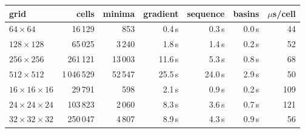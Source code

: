 \begin{tabular}{@{}lrrrrrr@{}}
\toprule
grid & cells & minima & gradient & sequence & basins & $\mu$s/cell \\
\midrule
$64\times64$ & 16\,129 & 853 & 0.4\,s & 0.3\,s & 0.0\,s & 44 \\
$128\times128$ & 65\,025 & 3\,240 & 1.8\,s & 1.4\,s & 0.2\,s & 52 \\
$256\times256$ & 261\,121 & 13\,003 & 11.6\,s & 5.3\,s & 0.8\,s & 68 \\
$512\times512$ & 1\,046\,529 & 52\,547 & 25.5\,s & 24.0\,s & 2.9\,s & 50 \\
$16\times16\times16$ & 29\,791 & 598 & 2.1\,s & 0.9\,s & 0.2\,s & 109 \\
$24\times24\times24$ & 103\,823 & 2\,060 & 8.3\,s & 3.6\,s & 0.7\,s & 121 \\
$32\times32\times32$ & 250\,047 & 4\,807 & 8.9\,s & 4.3\,s & 0.9\,s & 56 \\
\bottomrule
\end{tabular}

